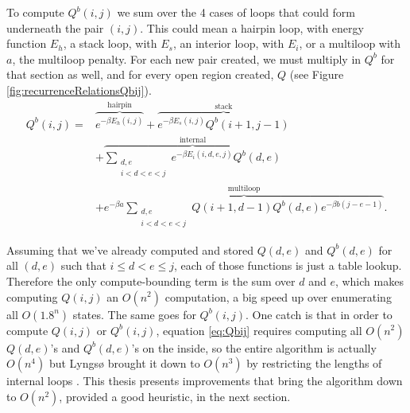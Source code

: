 

To compute $Q^b(i,j)$ we sum over the 4 cases of loops that could form
underneath the pair $(i,j)$. This could mean a hairpin loop,
with energy function $E_h$, a stack loop, with $E_s$, an interior
loop, with $E_i$, or a multiloop with $a$, the multiloop penalty. For
each new pair created, we must multiply in $Q^b$ for that section as
well, and for every open region created, $Q$ (see Figure
\ref{fig:recurrenceRelationsQbij}).
\begin{equation}
\begin{split}
 Q^b(i, j) =& \overbrace{e^{-\beta E_h(i,j)}}^{\text{hairpin}} +
 \overbrace{e^{-\beta E_s(i, j)} Q^b(i+1, j-1)}^{\text{stack}} \\ 
& + \overbrace{\sum_{\substack{d,e \\ i < d< e< j}} e^{-\beta E_i(i, d, e, j)}Q^b(d,e)}^{\text{internal}} \\ 
& + \overbrace{e^{-\beta a} \sum_{\substack{d,e \\ i < d< e< j}} Q(i+1, d-1) Q^b(d,e) e^{-\beta b(j-e-1)}}^{\text{multiloop}}.
\end{split}
\label{eq:Qbij}
\end{equation}

Assuming that we've already computed and stored $Q(d,e)$ and
$Q^b(d,e)$ for all $(d,e)$ such that $ i \leq d < e \leq j$, each of
those functions is just a table lookup. Therefore the only
compute-bounding term is the sum over $d$ and $e$, which makes
computing $Q(i,j)$ an $O(n^2)$ computation, a big speed up over
enumerating all $O(1.8^n)$ states. The same goes for $Q^b(i,j)$. One
catch is that in order to compute $Q(i,j)$ or $Q^b(i,j)$, equation
\ref{eq:Qbij} requires computing all $O(n^2)$ $Q(d,e)$'s and
$Q^b(d,e)$'s on the inside, so the entire algorithm is actually
$O(n^4)$ but Lyngs{\o} brought it down to $O(n^3)$ by restricting the
lengths of internal loops \cite{lyngso2000rna}. This thesis presents
improvements that bring the algorithm down to $O(n^2)$, provided a
good heuristic, in the next section.

